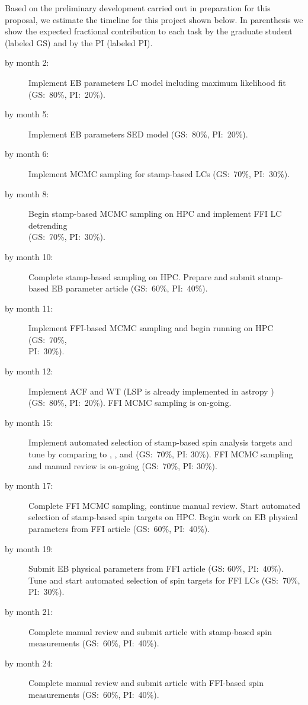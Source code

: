%
\label{sec:work_plan}

Based on the preliminary development carried out in preparation for this
proposal, we estimate the timeline for this project shown below. In parenthesis
we show the expected fractional contribution to each task by the graduate
student (labeled GS) and by the PI (labeled PI).

\begin{description}
%
    \item[by month 2:] Implement EB parameters LC model including maximum
        likelihood fit (GS:~80\%, PI:~20\%).
%
    \item[by month 5:] Implement EB parameters SED model (GS:~80\%, PI:~20\%).
%
    \item[by month 6:] Implement MCMC sampling for stamp-based LCs (GS:~70\%,
        PI:~30\%).
%
    \item[by month 8:] Begin stamp-based MCMC sampling on HPC and implement FFI
        LC detrending\\(GS:~70\%, PI:~30\%).
%
    \item[by month 10:] Complete stamp-based sampling on HPC. Prepare and submit
        stamp-based EB parameter article (GS:~60\%, PI:~40\%).
%
    \item[by month 11:] Implement FFI-based MCMC sampling and begin running on
        HPC (GS:~70\%,\\PI:~30\%).
%
    \item[by month 12:] Implement ACF and WT (LSP is already implemented in
        astropy \citep{astropy_lomb_scargle}) (GS:~80\%, PI:~20\%). FFI MCMC
        sampling is on-going.
%
    \item[by month 15:] Implement automated selection of stamp-based spin
        analysis targets and tune by comparing to \citep{CantoMartins_et_al_20},
        \citep{Oelkers_et_al_18}, and \citep{Lurie_et_al_17} (GS:~70\%, PI:
        30\%). FFI MCMC sampling and manual review is on-going (GS:~70\%, PI:
        30\%).
%
    \item[by month 17:] Complete FFI MCMC sampling, continue manual review.
        Start automated selection of stamp-based spin targets on HPC. Begin work
        on EB physical parameters from FFI article (GS:~60\%, PI:~40\%).
%
    \item[by month 19:] Submit EB physical parameters from FFI article (GS:
        60\%, PI:~40\%). Tune and start automated selection of spin targets for
        FFI LCs (GS:~70\%, PI:~30\%).
%
    \item[by month 21:] Complete manual review and submit article with
        stamp-based spin measurements (GS:~60\%, PI:~40\%).
%
    \item[by month 24:] Complete manual review and submit article with FFI-based
        spin measurements (GS:~60\%, PI:~40\%).
%
\end{description}
